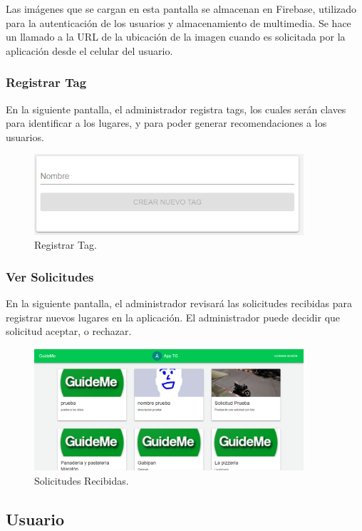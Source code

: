 \documentclass[12pt,letterpaper,openany]{book}
\begin{document}
Las imágenes que se cargan en esta pantalla se almacenan en Firebase, utilizado para la autenticación de los usuarios y almacenamiento de multimedia. Se hace un llamado a la URL de la ubicación de la imagen cuando es solicitada por la aplicación desde el celular del usuario.

\subsubsection{Registrar Tag}
En la siguiente pantalla, el administrador registra tags, los cuales serán claves para identificar a los lugares, y para poder generar recomendaciones a los usuarios.
\begin{figure}[H]
\begin{center}
\includegraphics[width=10cm]{./imagenes/admin/r_tags}
\caption{Registrar Tag.}
\end{center}
\end{figure}

\subsubsection{Ver Solicitudes}
En la siguiente pantalla, el administrador revisará las solicitudes recibidas para registrar nuevos lugares en la aplicación. El administrador puede decidir que solicitud aceptar, o rechazar.

\begin{figure}[H]
\begin{center}
\includegraphics[width=10cm]{./imagenes/admin/solicitudes}
\caption{Solicitudes Recibidas.}
\end{center}
\end{figure}

\subsection{Usuario}
\end{document}
